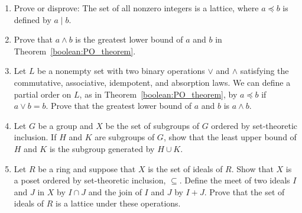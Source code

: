 {\begin{enumerate}
\begin{center}
\end{center}
 
 
 
 
 
 
 
\item
Prove or disprove: The set of all nonzero integers is a lattice, where
$a \preceq b$ is defined by $a \mid b$.
 
 
\item
Prove that $a \wedge b$ is the greatest lower bound of $a$ and $b$ in
Theorem~\ref{boolean:PO_theorem}.
 
 
\item
Let $L$ be a nonempty set with two binary operations $\vee$ and
$\wedge$ satisfying the commutative, associative, idempotent, and  
absorption laws.  We can define a partial order on $L$, as in
Theorem~\ref{boolean:PO_theorem}, by $a \preceq b$ if $a \vee b = b$. Prove that the
greatest lower bound of $a$ and $b$ is $a \wedge b$.
 
 
\item
Let $G$ be a group and $X$ be the set of subgroups of $G$ ordered by
set-theoretic inclusion. If $H$ and $K$ are subgroups of $G$, show
that the least upper bound of $H$ and $K$ is the subgroup generated by
$H \cup K$. 
 
 
\item
Let $R$ be a ring and suppose that $X$ is the set of ideals of
$R$.  Show that $X$ is a poset ordered by set-theoretic inclusion,
$\subseteq$. Define the meet of two ideals $I$ and $J$ in $X$ by $I \cap
J$ and the join of $I$ and $J$ by $I + J$. Prove that the set of
ideals of $R$ is a lattice under these operations. 
 

\end{enumerate}}

